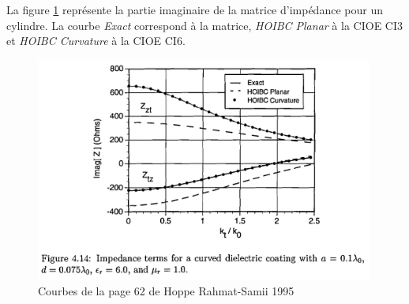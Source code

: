 La figure \ref{fig:annex:hoppe:p62} représente la partie imaginaire de la matrice d'impédance  pour un cylindre. La courbe \textit{Exact} correspond à la matrice, \textit{HOIBC Planar} à la CIOE CI3 et \textit{HOIBC Curvature} à la CIOE CI6.

\begin{figure}[h!tb]
    \includegraphics[width=0.99\textwidth]{images/hoppe/p62_imp_cylindre.png}
    \caption{Courbes de la page 62 de Hoppe Rahmat-Samii 1995}
    \label{fig:annex:hoppe:p62}
\end{figure}
